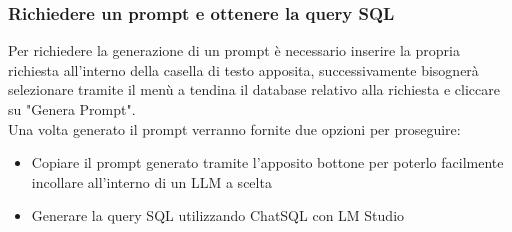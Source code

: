 \documentclass[5pt]{article}
\begin{document}
	    \subsubsection{Richiedere un prompt e ottenere la query SQL}
	    Per richiedere la generazione di un prompt è necessario inserire la propria richiesta all'interno della casella di testo apposita, successivamente bisognerà selezionare tramite il menù a tendina il database relativo alla richiesta e cliccare su "Genera Prompt".\\
	    Una volta generato il prompt verranno fornite due opzioni per proseguire:
	    \begin{itemize}
	    	\item Copiare il prompt generato tramite l'apposito bottone per poterlo facilmente incollare all'interno di un LLM a scelta
	    	\item Generare la query SQL utilizzando ChatSQL con LM Studio
	    \end{itemize} 
\end{document}
